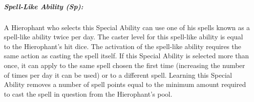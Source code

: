 \subparagraph{Spell-Like Ability (Sp):}
A Hierophant who selects this Special Ability can use one of his spells known as a spell-like ability twice per day.
The caster level for this spell-like ability is equal to the Hierophant's hit dice.
The activation of the spell-like ability requires the same action as casting the spell itself.
If this Special Ability is selected more than once, it can apply to the same spell chosen the first time (increasing the number of times per day it can be used) or to a different spell.
Learning this Special Ability removes a number of spell points equal to the minimum amount required to cast the spell in question from the Hierophant's pool.

